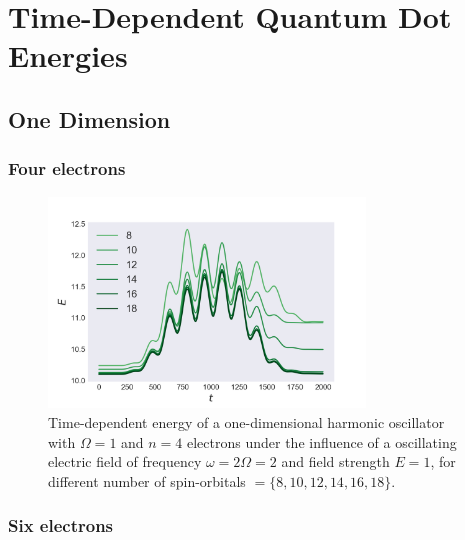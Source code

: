 \chapter{Time-Dependent Quantum Dot Energies}

\section{One Dimension}
\label{app:1d_qd}

\subsection*{Four electrons}

\begin{figure}[h]
    \centering
    \includegraphics[width=0.75\textwidth]{results/figures/1D/n=4energy.png} 
    \caption{Time-dependent energy of a one-dimensional harmonic oscillator with $\Omega=1$
        and $n=4$ electrons under the influence of a oscillating electric field 
        of frequency $\omega = 2 \Omega = 2$ and field strength $E=1$, for 
        different number of spin-orbitals $=\{8,10,12,14,16,18\}$.
    }
    \label{fig:1d_n4_qd}
\end{figure}

\pagebreak

\subsection*{Six electrons}

